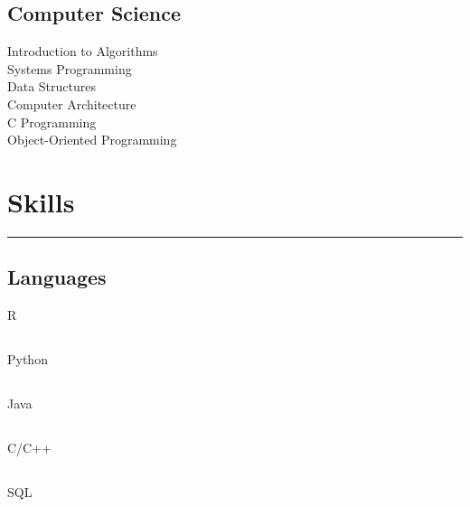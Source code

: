 \documentclass[]{sahana}
\begin{document}
\begin{minipage}[t]{0.33\textwidth}
\subsection{Computer Science}
Introduction to Algorithms\\
Systems Programming\\
Data Structures\\
Computer Architecture\\
C Programming\\
Object-Oriented Programming
\sectionsep

\section{Skills}
\noindent\rule{5cm}{0.4pt}
\subsection{Languages}
R \hfill{}\hspace{40pt}
\subsection{}\vspace{-12pt}
Python \hfill{}\hspace{40pt}
\subsection{}\vspace{-12pt}
Java \hfill{}\hspace{40pt}
\subsection{}\vspace{-12pt}
C/C++ \hfill{}\hspace{40pt}
\subsection{}\vspace{-12pt}
SQL \hspace*{0pt}\hfill{}\hspace{40pt}

\end{minipage}
\end{document}
